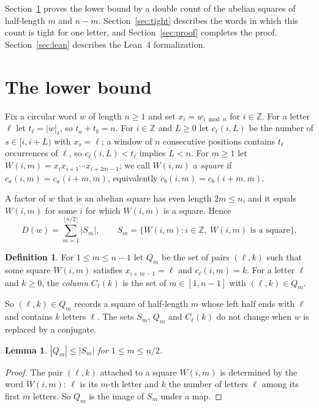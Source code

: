 \documentclass[11pt,reqno]{amsart}
\newtheorem{lemma}[theorem]{Lemma}
\theoremstyle{definition}
\newtheorem{definition}[theorem]{Definition}
\newcommand{\Z}{\mathbb{Z}}
\newcommand{\fl}[1]{\lfloor #1\rfloor}
\begin{document}
Section~\ref{sec:lower} proves the lower bound by a double count of the abelian squares of half-length $m$ and $n-m$. Section~\ref{sec:tight} describes the words in which this count is tight for one letter, and Section~\ref{sec:proof} completes the proof. Section~\ref{sec:lean} describes the Lean~4 formalization.

\section{The lower bound}\label{sec:lower}

Fix a circular word $w$ of length $n\ge 1$ and set $x_i=w_{i\bmod n}$ for $i\in\Z$. For a letter $\ell$ let $t_\ell=|w|_\ell$, so $t_a+t_b=n$. For $i\in\Z$ and $L\ge 0$ let $c_\ell(i,L)$ be the number of $s\in[i,i+L)$ with $x_s=\ell$; a window of $n$ consecutive positions contains $t_\ell$ occurrences of $\ell$, so $c_\ell(i,L)<t_\ell$ implies $L<n$. For $m\ge 1$ let $W(i,m)=x_ix_{i+1}\cdots x_{i+2m-1}$; we call $W(i,m)$ a \emph{square} if $c_a(i,m)=c_a(i+m,m)$, equivalently $c_b(i,m)=c_b(i+m,m)$.

A factor of $w$ that is an abelian square has even length $2m\le n$, and it equals $W(i,m)$ for some $i$ for which $W(i,m)$ is a square. Hence
\[
D(w)=\sum_{m=1}^{\fl{n/2}}|S_m|,\qquad S_m=\{W(i,m): i\in\Z,\ W(i,m)\text{ is a square}\}.
\]

\begin{definition}\label{def:Q}
For $1\le m\le n-1$ let $Q_m$ be the set of pairs $(\ell,k)$ such that some square $W(i,m)$ satisfies $x_{i+m-1}=\ell$ and $c_\ell(i,m)=k$. For a letter $\ell$ and $k\ge 0$, the \emph{column} $C_\ell(k)$ is the set of $m\in[1,n-1]$ with $(\ell,k)\in Q_m$.
\end{definition}

So $(\ell,k)\in Q_m$ records a square of half-length $m$ whose left half ends with $\ell$ and contains $k$ letters $\ell$. The sets $S_m$, $Q_m$ and $C_\ell(k)$ do not change when $w$ is replaced by a conjugate.

\begin{lemma}\label{lem:QS}
$|Q_m|\le|S_m|$ for $1\le m\le n/2$.
\end{lemma}

\begin{proof}
The pair $(\ell,k)$ attached to a square $W(i,m)$ is determined by the word $W(i,m)$: $\ell$ is its $m$-th letter and $k$ the number of letters $\ell$ among its first $m$ letters. So $Q_m$ is the image of $S_m$ under a map.
\end{proof}
\end{document}
